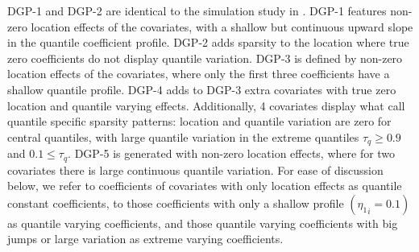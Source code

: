 %
$\mathrm{DGP}$-1 and $\mathrm{DGP}$-2 are identical to the simulation study in \citet{bondell2010noncrossing}. $\mathrm{DGP}$-1 features non-zero location effects of the covariates, with a shallow but continuous upward slope in the quantile coefficient profile. $\mathrm{DGP}$-2 adds sparsity to the location where true zero coefficients do not display quantile variation. $\mathrm{DGP}$-3 is defined by non-zero location effects of the covariates, where only the first three coefficients have a shallow quantile profile. $\mathrm{DGP}$-4 adds to $\mathrm{DGP}$-3 extra covariates with true zero location and quantile varying effects. Additionally, 4 covariates display what \citet{kohns2021decoupling} call quantile specific sparsity patterns: location and quantile variation are zero for central quantiles, with large quantile variation in the extreme quantiles $\tau_q\geq0.9$ and $0.1\leq\tau_q$. $\mathrm{DGP}$-5 is generated with non-zero location effects, where for two covariates there is large continuous quantile variation. For ease of discussion below, we refer to coefficients of covariates with only location effects as quantile constant coefficients, to those coefficients with only a shallow profile $({\eta_1}_i = 0.1)$ as quantile varying coefficients, and those quantile varying coefficients with big jumps or large variation as extreme varying coefficients. %
%

%

